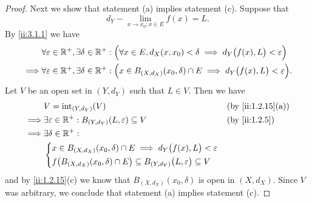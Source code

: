 \begin{proof}
  Next we show that statement (a) implies statement (c).
  Suppose that
  \[
    d_Y - \lim_{x \to x_0 ; x \in E} f(x) = L.
  \]
  By \cref{ii:3.1.1} we have
  \begin{align*}
             & \forall \varepsilon \in \mathbb{R}^+, \exists \delta \in \mathbb{R}^+ : \Big(\forall x \in E, d_X(x, x_0) < \delta \implies d_Y\big(f(x), L\big) < \varepsilon\Big)   \\
    \implies & \forall \varepsilon \in \mathbb{R}^+, \exists \delta \in \mathbb{R}^+ : \Big(x \in B_{(X, d_X)}(x_0, \delta) \cap E \implies d_Y\big(f(x), L\big) < \varepsilon\Big).
  \end{align*}
  Let \(V\) be an open set in \((Y, d_Y)\) such that \(L \in V\).
  Then we have
  \begin{align*}
             & V = \text{int}_{(Y, d_Y)}(V)                                                                           &  & \by{ii:1.2.15}[a] \\
    \implies & \exists \varepsilon \in \R^+ : B_{(Y, d_Y)}(L, \varepsilon) \subseteq V                                &  & \by{ii:1.2.5}     \\
    \implies & \exists \delta \in \R^+ :                                                                                                     \\
             & \begin{dcases}
                 x \in B_{(X, d_X)}(x_0, \delta) \cap E \implies d_Y\big(f(x), L\big) < \varepsilon \\
                 f\big(B_{(X, d_X)}(x_0, \delta) \cap E\big) \subseteq B_{(Y, d_Y)}\big(L, \varepsilon\big) \subseteq V
               \end{dcases}
  \end{align*}
  and by \cref{ii:1.2.15}(c) we know that \(B_{(X, d_X)}(x_0, \delta)\) is open in \((X, d_X)\).
  Since \(V\) was arbitrary, we conclude that statement (a) implies statement (c).


\end{proof}
